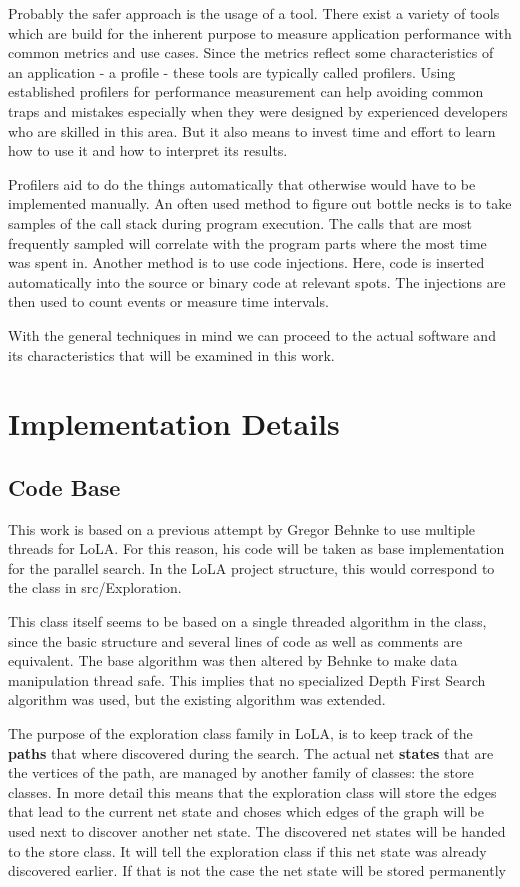 Probably the safer approach is the usage of a tool. There exist a variety of tools which are build for the inherent purpose to measure application performance with common metrics and use cases. Since the metrics reflect some characteristics of an application - a profile - these tools are typically called profilers. Using established profilers for performance measurement can help avoiding common traps and mistakes especially when they were designed by experienced developers who are skilled in this area. But it also means to invest time and effort to learn how to use it and how to interpret its results.

Profilers aid to do the things automatically that otherwise would have to be implemented manually. An often used method to figure out bottle necks is to take samples of the call stack during program execution. The calls that are most frequently sampled will correlate with the program parts where the most time was spent in. Another method is to use code injections. Here, code is inserted automatically into the source or binary code at relevant spots. The injections are then used to count events or measure time intervals.

With the general techniques in mind we can proceed to the actual software and its characteristics that will be examined in this work.

\section{Implementation Details}
\subsection{Code Base}
\label{codeBase}
This work is based on a previous attempt by Gregor Behnke to use multiple threads for LoLA. For this reason, his code will be taken as base implementation for the parallel search. In the LoLA project structure, this would correspond to the  class in src/Exploration.

This class itself seems to be based on a single threaded algorithm in the  class, since the basic structure and several lines of code as well as comments are equivalent. The base algorithm was then altered by Behnke to make data manipulation thread safe. This implies that no specialized Depth First Search algorithm was used, but the existing algorithm was extended.

The purpose of the exploration class family in LoLA, is to keep track of the \textbf{paths} that where discovered during the search. The actual net \textbf{states} that are the vertices of the path, are managed by another family of classes: the store classes. In more detail this means that the exploration class will store the edges that lead to the current net state and choses which edges of the graph will be used next to discover another net state. The discovered net states will be handed to the store class. It will tell the exploration class if this net state was already discovered earlier. If that is not the case the net state will be stored permanently

